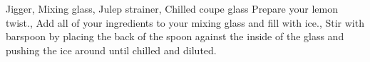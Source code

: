 \documentclass[../main.tex]{subfiles}
\begin{document}
\clearpage
{}

%
{Jigger, Mixing glass, Julep strainer, Chilled coupe glass}
%
{
	Prepare your lemon twist.,
	Add all of your ingredients to your mixing glass and fill with ice.,
	Stir with barspoon by placing the back of the spoon against the inside of the glass and pushing the ice around until chilled and diluted.
}
\end{document}
